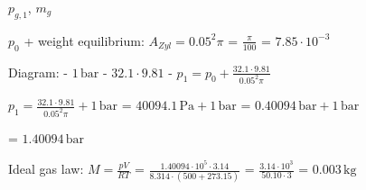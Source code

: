 \( p_{g,1} \), \( m_g \)  

\( p_0 \) + weight equilibrium:  
\( A_{Zyl} = 0.05^2 \pi \)  
= \( \frac{\pi}{100} \)  
= \( 7.85 \cdot 10^{-3} \)  

Diagram:  
- \( 1 \, \text{bar} \)  
- \( 32.1 \cdot 9.81 \)  
- \( p_1 = p_0 + \frac{32.1 \cdot 9.81}{0.05^2 \pi} \)  

\( p_1 = \frac{32.1 \cdot 9.81}{0.05^2 \pi} + 1 \, \text{bar} \)  
= \( 40094.1 \, \text{Pa} + 1 \, \text{bar} \)  
= \( 0.40094 \, \text{bar} + 1 \, \text{bar} \)  

= \( 1.40094 \, \text{bar} \)  

Ideal gas law:  
\( M = \frac{p V}{R T} \)  
= \( \frac{1.40094 \cdot 10^5 \cdot 3.14}{8.314 \cdot (500 + 273.15)} \)  
= \( \frac{3.14 \cdot 10^3}{50.10 \cdot 3} \)  
= \( 0.003 \, \text{kg} \)